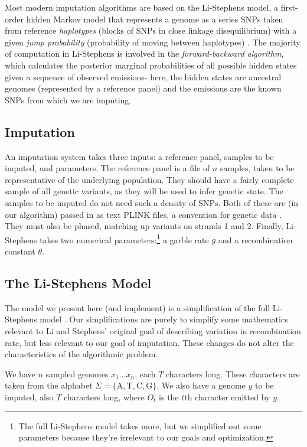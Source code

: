 \documentclass[12pt]{article}
\begin{document}
Most modern imputation algorithms are based on the Li-Stephens model, a first-order hidden Markov model that represents a genome as a series SNPs taken from reference \textit{haplotypes} (blocks of SNPs in close linkage disequilibrium) with a given \textit{jump probability} (probability of moving between haplotypes) \cite{listephens}. The majority of computation in Li-Stephens is involved in the \textit{forward-backward algorithm}, which calculates the posterior marginal probabilities of all possible hidden states given a sequence of observed emissions- here, the hidden states are ancestral genomes (represented by a reference panel) and the emissions are the known SNPs from which we are imputing.

\subsection{Imputation}

An imputation system takes three inputs: a reference panel, samples to be imputed, and parameters.  The reference panel is a file of $n$ samples, taken to be representative of the underlying population.  They should have a fairly complete sample of all genetic variants, as they will be used to infer genetic state.  The samples to be imputed do not need such a density of SNPs.  Both of these are (in our algorithm) passed in as text PLINK files, a convention for genetic data \cite{plinkpaper}.  They must also be phased, matching up variants on strands 1 and 2.  Finally, Li-Stephens takes two numerical parameters:\footnote{The full Li-Stephens model takes more, but we simplified out some parameters because they're irrelevant to our goals and optimization.} a garble rate $g$ and a recombination constant $\theta$.

\subsection{The Li-Stephens Model}

The model we present here (and implement) is a simplification of the full Li-Stephens model \cite{listephens}.  Our simplifications are purely to simplify some mathematics relevant to Li and Stephens' original goal of describing variation in recombination rate, but less relevant to our goal of imputation.  These changes do not alter the characteristics of the algorithmic problem.

We have $n$ sampled genomes $x_1 \ldots x_n$, each $T$ characters long.  These characters are taken from the alphabet $\Sigma = \{\text{A}, \text{T}, \text{C}, \text{G}\}$.  We also have a genome $y$ to be imputed, also $T$ characters long, where $O_t$ is the $t$th character emitted by $y$.  
\end{document}
